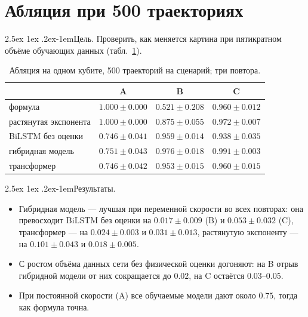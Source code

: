 \documentclass[12pt,a4paper]{report}
\makeatletter
\renewcommand\paragraph{\@startsection{paragraph}{4}{\z@}%
  {2.5ex \@plus1ex \@minus.2ex}{-1em}{\normalfont\normalsize\bfseries}}
\numberwithin{equation}{chapter}
\makeatother
\begin{document}
\section{Абляция при 500 траекториях}
\label{sec:r11}

\paragraph{Цель.} Проверить, как меняется картина при пятикратном объёме
обучающих данных (табл.~\ref{tab:r11}).

\begin{table}[h]
\centering
\caption{Абляция на одном кубите, 500 траекторий на сценарий; три повтора.}
\label{tab:r11}
\small
\begin{tabular}{@{}lccc@{}}
\toprule
 & A & B & C \\
\midrule
формула & $1.000\pm0.000$ & $0.521\pm0.208$ & $0.960\pm0.012$ \\
растянутая экспонента & $1.000\pm0.000$ & $0.875\pm0.055$ & $0.972\pm0.007$ \\
BiLSTM без оценки & $0.746\pm0.041$ & $0.959\pm0.014$ & $0.938\pm0.035$ \\
гибридная модель & $0.751\pm0.043$ & $\mathbf{0.976\pm0.018}$ & $\mathbf{0.991\pm0.003}$ \\
трансформер & $0.746\pm0.042$ & $0.953\pm0.015$ & $0.960\pm0.015$ \\
\bottomrule
\end{tabular}
\end{table}

\paragraph{Результаты.}
\begin{itemize}
\item Гибридная модель --- лучшая при переменной скорости во всех повторах:
      она превосходит BiLSTM без оценки на $0.017\pm0.009$ (B) и
      $0.053\pm0.032$ (C), трансформер --- на $0.024\pm0.003$ и
      $0.031\pm0.013$, растянутую экспоненту --- на $0.101\pm0.043$ и
      $0.018\pm0.005$.
\item С ростом объёма данных сети без физической оценки догоняют: на B
      отрыв гибридной модели от них сокращается до $0.02$, на C остаётся
      $0.03$--$0.05$.
\item При постоянной скорости (A) все обучаемые модели дают около $0.75$,
      тогда как формула точна.
\end{itemize}
\end{document}
